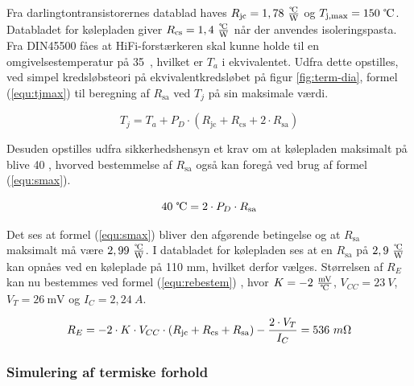 Fra darlingtontransistorernes datablad haves $R_{\mathrm{jc}} = 1,78~\tfrac{\celsius}{\mathrm{W}}$ og $T_{\mathrm{j,max}} = 150~\celsius$. Databladet for kølepladen giver $R_{\mathrm{cs}} = 1,4~\tfrac{\celsius}{\mathrm{W}}$ når der anvendes isoleringspasta. Fra DIN45500 \cite{DIN45500} fåes at HiFi-forstærkeren skal kunne holde til en omgivelsestemperatur på 35~\celsius, hvilket er $T_a$ i ekvivalentet. Udfra dette opstilles, ved simpel kredsløbsteori på ekvivalentkredsløbet på figur \ref{fig:term-dia}, formel (\ref{equ:tjmax}) til beregning af $R_{\mathrm{sa}}$ ved $T_j$  på sin maksimale værdi. 

\begin{equation}
\label{equ:tjmax}
T_j = T_a + P_D \cdot (R_{\mathrm{jc}} + R_{\mathrm{cs}} + 2 \cdot R_{\mathrm{sa}})
\end{equation}

Desuden opstilles udfra sikkerhedshensyn et krav om at kølepladen maksimalt på blive 40 \celsius, hvorved bestemmelse af $R_{\mathrm{sa}}$ også kan foregå ved brug af formel (\ref{equ:smax}). 

\begin{equation}
\label{equ:smax}
40~\celsius = 2 \cdot P_D \cdot R_{\mathrm{sa}}
\end{equation}

Det ses at formel (\ref{equ:smax}) bliver den afgørende betingelse og at $R_{\mathrm{sa}}$ maksimalt må være $2,99~\tfrac{\celsius}{\mathrm{W}}$. I databladet for kølepladen ses at en $R_{\mathrm{sa}}$ på $2,9~\tfrac{\celsius}{\mathrm{W}}$ kan opnåes ved en køleplade på 110 mm, hvilket derfor vælges. Størrelsen af $R_E$ kan nu bestemmes ved formel (\ref{equ:rebestem}) \cite{ael-mm19} 
, hvor $K = - 2~\tfrac{\mathrm{mV}}{\celsius}$, $V_{CC} = 23~V$, $V_T = 26~\mathrm{mV}$ og $I_C = 2,24~A$.

\begin{equation}
\label{equ:rebestem}
R_E = - 2 \cdot K \cdot V_{CC} \cdot (R_{\mathrm{jc}} + R_{\mathrm{cs}} + R_{\mathrm{sa}}) - \frac{2 \cdot V_T}{I_C} = 536~m\ohm
\end{equation}

\subsubsection*{Simulering af termiske forhold}

